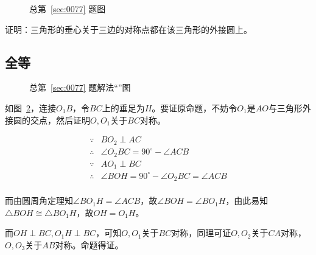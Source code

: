 

\begin{figure}[htbp]
  \centering
  \caption{总第~\ref{sec:0077} 题图} \label{fig:0077}
\end{figure}

证明：三角形的垂心关于三边的对称点都在该三角形的外接圆上。

\subsection{全等} \label{subsec:0077-eqtri}

\begin{figure}[htbp]
  \centering
  \caption{总第~\ref{sec:0077} 题解法“”图}
  \label{fig:0077-eqtri}
\end{figure}

如图~\ref{fig:0077-eqtri}，连接$O_1B$，令$BC$上的垂足为$H$。要证原命题，不妨令$O_1$是$AO$与三角形外接圆的交点，然后证明$O, O_1$关于$BC$对称。

\begin{align*}
  \because  {}& BO_2 \perp AC \\
  \therefore{}& \angle O_2BC = 90^\circ - \angle ACB \\
  \because  {}& AO_1 \perp BC \\
  \therefore{}& \angle BOH = 90^\circ - \angle O_2BC = \angle ACB \\
\end{align*}

而由圆周角定理知$\angle BO_1H = \angle ACB$，故$\angle BOH = \angle BO_1H$，由此易知$\triangle BOH \cong \triangle BO_1H$，故$OH = O_1H$。

而$OH \perp BC, O_1H \perp BC$，可知$O, O_1$关于$BC$对称，同理可证$O, O_2$关于$CA$对称，$O, O_3$关于$AB$对称。命题得证。
